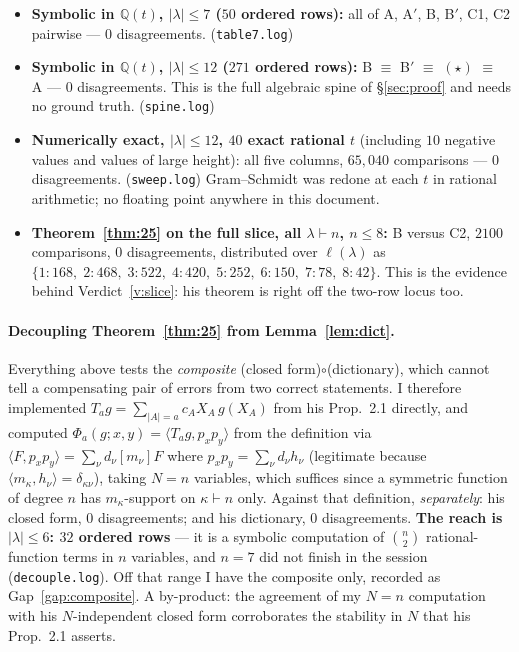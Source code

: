 \documentclass[11pt]{article}
\theoremstyle{definition}
\newcommand{\lam}{\lambda}
\newcommand{\QQ}{\mathbb{Q}}
\begin{document}
\begin{itemize}
\item \textbf{Symbolic in $\QQ(t)$, $|\lam|\le7$ ($50$ ordered rows):} all of
A, A$'$, B, B$'$, C1, C2 pairwise --- $0$ disagreements. (\texttt{table7.log})
\item \textbf{Symbolic in $\QQ(t)$, $|\lam|\le12$ ($271$ ordered rows):}
B $\equiv$ B$'$ $\equiv$ $(\star)$ $\equiv$ A --- $0$ disagreements. This is the full algebraic
spine of \S\ref{sec:proof} and needs no ground truth. (\texttt{spine.log})
\item \textbf{Numerically exact, $|\lam|\le12$, $40$ exact rational $t$} (including $10$ negative
values and values of large height): all five columns, $65{,}040$ comparisons --- $0$
disagreements. (\texttt{sweep.log}) Gram--Schmidt was redone at each $t$ in rational arithmetic;
no floating point anywhere in this document.
\item \textbf{Theorem~\ref{thm:25} on the full slice, all $\lam\vdash n$, $n\le8$:} B versus C2,
$2100$ comparisons, $0$ disagreements, distributed over $\ell(\lam)$ as
$\{1{:}168,\;2{:}468,\;3{:}522,\;4{:}420,\;5{:}252,\;6{:}150,\;7{:}78,\;8{:}42\}$. This is the
evidence behind Verdict~\ref{v:slice}: his theorem is right off the two-row locus too.
\end{itemize}

\paragraph{Decoupling Theorem~\ref{thm:25} from Lemma~\ref{lem:dict}.}
Everything above tests the \emph{composite} (closed form)$\circ$(dictionary), which cannot tell a
compensating pair of errors from two correct statements. I therefore implemented
$T_ag=\sum_{|A|=a}c_AX_A\,g(X_A)$ from his Prop.~2.1 directly, and computed
$\Phi_a(g;x,y)=\langle T_ag,p_xp_y\rangle$ from the definition via
$\langle F,p_xp_y\rangle=\sum_\nu d_\nu[m_\nu]F$ where $p_xp_y=\sum_\nu d_\nu h_\nu$ (legitimate
because $\langle m_\kappa,h_\nu\rangle=\delta_{\kappa\nu}$), taking $N=n$ variables, which suffices
since a symmetric function of degree $n$ has $m_\kappa$-support on $\kappa\vdash n$ only. Against
that definition, \emph{separately}: his closed form, $0$ disagreements; and his dictionary, $0$
disagreements. \textbf{The reach is $|\lam|\le6$: $32$ ordered rows} --- it is a symbolic
computation of $\binom{n}{2}$ rational-function terms in $n$ variables, and $n=7$ did not finish
in the session (\texttt{decouple.log}). Off that range I have the composite only, recorded as
Gap~\ref{gap:composite}. A by-product: the agreement of my $N=n$ computation with his
$N$-independent closed form corroborates the stability in $N$ that his Prop.~2.1 asserts.
\end{document}
